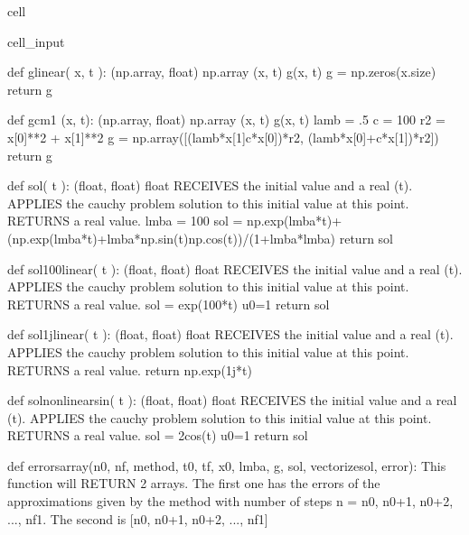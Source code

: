 \documentclass[letterpaper,10pt,english]{jupyterBook}
\begin{document}
\begin{sphinxuseclass}{cell}
\begin{sphinxVerbatimInput}
\begin{sphinxuseclass}{cell_input}
\begin{sphinxVerbatim}[commandchars=\\\{\}]
def g\PYGZus{}linear( x, t ):
    \PYGZsq{}\PYGZsq{}\PYGZsq{} (np.array, float) \PYGZhy{}\PYGZgt{} np.array
        (x, t) \PYGZhy{}\PYGZgt{} g(x, t)
    \PYGZsq{}\PYGZsq{}\PYGZsq{}
    g = np.zeros(x.size)
    return g

def g\PYGZus{}cm1 (x, t):
    \PYGZsq{}\PYGZsq{}\PYGZsq{} (np.array, float) \PYGZhy{}\PYGZgt{} np.array
        (x, t) \PYGZhy{}\PYGZgt{} g(x, t)
    \PYGZsq{}\PYGZsq{}\PYGZsq{}
    lamb = .5
    c = 100
    r\PYGZus{}2 = x[0]**2 + x[1]**2
    g = np.array([(lamb*x[1]\PYGZhy{}c*x[0])*r\PYGZus{}2, \PYGZhy{}(lamb*x[0]+c*x[1])*r\PYGZus{}2])
    return g

def sol( t ):
    \PYGZsq{}\PYGZsq{}\PYGZsq{} (float, float) \PYGZhy{}\PYGZgt{} float
    RECEIVES the initial value and a real (t).
    APPLIES the cauchy problem solution to this initial value at this point.
    RETURNS a real value.
    \PYGZsq{}\PYGZsq{}\PYGZsq{}
    lmba = 100
    sol = np.exp(\PYGZhy{}lmba*t)+(np.exp(\PYGZhy{}lmba*t)+lmba*np.sin(t)\PYGZhy{}np.cos(t))/(1+lmba*lmba)
    return sol

def sol\PYGZus{}100\PYGZus{}linear( t ):
    \PYGZsq{}\PYGZsq{}\PYGZsq{} (float, float) \PYGZhy{}\PYGZgt{} float
    RECEIVES the initial value and a real (t).
    APPLIES the cauchy problem solution to this initial value at this point.
    RETURNS a real value.
    \PYGZsq{}\PYGZsq{}\PYGZsq{}
    sol = exp(\PYGZhy{}100*t) \PYGZsh{}u0=1
    return sol

def sol\PYGZus{}1j\PYGZus{}linear( t ):
    \PYGZsq{}\PYGZsq{}\PYGZsq{} (float, float) \PYGZhy{}\PYGZgt{} float
    RECEIVES the initial value and a real (t).
    APPLIES the cauchy problem solution to this initial value at this point.
    RETURNS a real value.
    \PYGZsq{}\PYGZsq{}\PYGZsq{}
    return np.exp(1j*t)

def sol\PYGZus{}non\PYGZus{}linear\PYGZus{}sin( t ):
    \PYGZsq{}\PYGZsq{}\PYGZsq{} (float, float) \PYGZhy{}\PYGZgt{} float
    RECEIVES the initial value and a real (t).
    APPLIES the cauchy problem solution to this initial value at this point.
    RETURNS a real value.
    \PYGZsq{}\PYGZsq{}\PYGZsq{}
    sol = 2\PYGZhy{}cos(t) \PYGZsh{}u0=1
    return sol

def errors\PYGZus{}array(n0, nf, method, t0, tf, x0, lmba, g, sol, vectorize\PYGZus{}sol, error):
  \PYGZsq{}\PYGZsq{}\PYGZsq{}
  This function will RETURN 2 arrays.
  The first one has the errors of the approximations given by the method with
  number of steps n = n0, n0+1, n0+2, ..., nf\PYGZhy{}1.
  The second is [n0, n0+1, n0+2, ..., nf\PYGZhy{}1]


\end{sphinxVerbatim}
\end{sphinxuseclass}
\end{sphinxVerbatimInput}
\end{sphinxuseclass}
\end{document}
